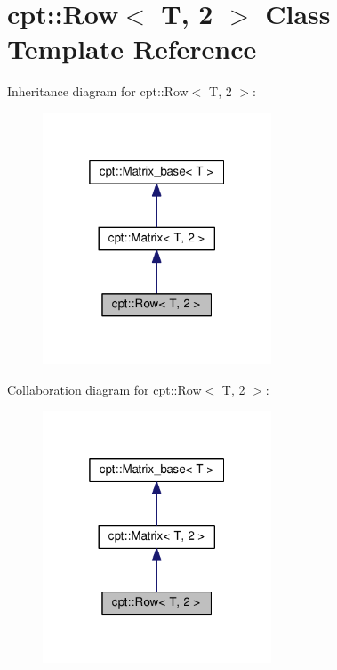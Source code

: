 \hypertarget{classcpt_1_1Row_3_01T_00_012_01_4}{}\section{cpt\+:\+:Row$<$ T, 2 $>$ Class Template Reference}
\label{classcpt_1_1Row_3_01T_00_012_01_4}


Inheritance diagram for cpt\+:\+:Row$<$ T, 2 $>$\+:
\nopagebreak
\begin{figure}[H]
\begin{center}
\leavevmode
\includegraphics[width=193pt]{classcpt_1_1Row_3_01T_00_012_01_4__inherit__graph}
\end{center}
\end{figure}


Collaboration diagram for cpt\+:\+:Row$<$ T, 2 $>$\+:
\nopagebreak
\begin{figure}[H]
\begin{center}
\leavevmode
\includegraphics[width=193pt]{classcpt_1_1Row_3_01T_00_012_01_4__coll__graph}
\end{center}
\end{figure}
